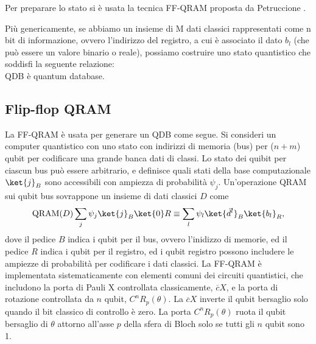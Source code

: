 Per preparare lo stato si è usata la tecnica FF-QRAM proposta da Petruccione \cite{petruccione}. 

Più genericamente, se abbiamo un insieme di M dati classici rappresentati come 
n bit di informazione, ovvero l'indirizzo del registro, a cui è associato il dato 
$b_l$ (che può essere un valore binario o reale), possiamo costruire uno stato 
quantistico che soddisfi la seguente relazione: 
\begin{equation} \label{eq:qdb}
\end{equation}
QDB è quantum database. 

\subsection{Flip-flop QRAM} \label{sec:ff-qram}

La \ac{FF-QRAM} è usata per generare un \ac{QDB} come segue. Si consideri un 
computer quantistico con uno stato con indirizzi di memoria (bus) per ($n+m$) qubit per codificare 
una grande banca dati di classi. Lo stato dei quibit per ciascun bus può essere 
arbitrario, e definisce quali stati della base computazionale $\ket{j}_B$ 
sono accessibili con ampiezza di probabilità $\psi_j$. 
Un'operazione QRAM sui qubit bus sovrappone un insieme di dati classici 
$D$ come 
\begin{equation}
    \text{QRAM}(D)\sum_j \psi_j \ket{j}_B \ket{0}R \equiv 
    \sum_l \psi_l \ket{\vec{d}^l}_B \ket{b_l}_R,
\end{equation}
dove il pedice $B$ indica i qubit per il bus, ovvero l'inidizzo di memorie, 
ed il pedice $R$ indica i qubit per il registro, ed i qubit registro 
possono includere le ampiezze di probabilità per codificare i dati classici. 
La \ac{FF-QRAM} è implementata sistematicamente con elementi comuni dei circuiti 
quantistici, che includono la porta di Pauli X controllata classicamente, $\overline{c}X$, 
e la porta di rotazione controllata da $n$ qubit, $C^n R_p (\theta)$. 
La $\overline{c}X$ inverte il qubit bersaglio solo quando il bit classico di 
controllo è zero. La porta $C^n R_p (\theta)$ ruota il qubit bersaglio di $\theta$ attorno 
all'asse $p$ della sfera di Bloch solo se tutti gli $n$ qubit sono 1. 

